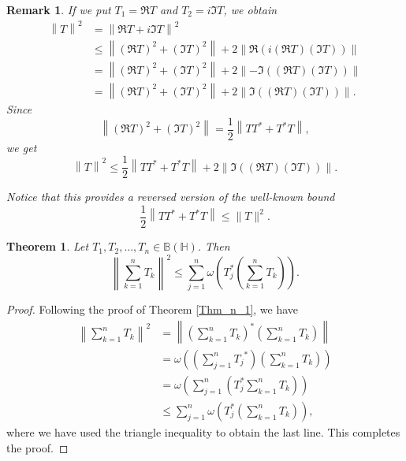 \documentclass[12pt,twoside,reqno]{amsart}
\newtheorem{theorem}{Theorem}[section]
\newtheorem{remark}{Remark}[section]
\numberwithin{equation}{section}
\begin{document}
\begin{remark}
If we put ${{T}_{1}}=\Re T$ and ${{T}_{2}}=i\Im T$, we obtain
	\[\begin{aligned}
   {{\left\| T \right\|}^{2}}&={{\left\| \Re T+i\Im T \right\|}^{2}} \\ 
 & \le \left\| {{\left( \Re T \right)}^{2}}+{{\left( \Im T \right)}^{2}} \right\|+2\left\| \Re\left( i\left( \Re T \right)\left( \Im T \right) \right) \right\| \\ 
 & =\left\| {{\left( \Re T \right)}^{2}}+{{\left( \Im T \right)}^{2}} \right\|+2\left\| -\Im\left( \left( \Re T \right)\left( \Im T \right) \right) \right\| \\ 
 & =\left\| {{\left( \Re T \right)}^{2}}+{{\left( \Im T \right)}^{2}} \right\|+2\left\| \Im\left( \left( \Re T \right)\left( \Im T \right) \right) \right\|.  
\end{aligned}\]
Since
	\[\left\| {{\left( \Re T \right)}^{2}}+{{\left( \Im T \right)}^{2}} \right\|=\frac{1}{2}\left\| T{{T}^{*}}+{{T}^{*}}T \right\|,\]
we get
	\[{{\left\| T \right\|}^{2}}\le \frac{1}{2}\left\| T{{T}^{*}}+{{T}^{*}}T \right\|+2\left\| \Im \left( \left( \Re T \right)\left( \Im T \right) \right) \right\|.\]
	
	Notice that this provides a reversed version of the well-known bound
	\[ \frac{1}{2}\left\| T{{T}^{*}}+{{T}^{*}}T \right\|\leq\|T\|^2.\]
\end{remark}














\begin{theorem}\label{Thm_n_2}
 Let ${{T}_{1}},{{T}_{2}},\ldots ,{{T}_{n}}\in \mathbb B\left( \mathbb H \right)$. Then 
	\[{{\left\| \sum\limits_{k=1}^{n}{{{T}_{k}}} \right\|}^{2}}\le \sum\limits_{j=1}^{n}{\omega \left( T_{j}^{*}\left( \sum\limits_{k=1}^{n}{{{T}_{k}}} \right) \right)}.\]
\end{theorem}
\begin{proof}
Following the proof of Theorem \ref{Thm_n_1}, we have
\begin{align*}
{{\left\| \sum\limits_{k=1}^{n}{{{T}_{k}}} \right\|}^{2}}&=\left\|\left(\sum\limits_{k=1}^{n}{{{T}_{k}}}\right)^*\left(\sum\limits_{k=1}^{n}T_{k}\right)\right\|\\
&=\omega\left( \left(\sum\limits_{j=1}^{n}{{{T}_{j}}}^*\right)\left(\sum\limits_{k=1}^{n}T_{k}\right)     \right)\\
&=\omega\left(\sum_{j=1}^{n}\left(T_j^*\sum_{k=1}^{n}T_{k}\right)\right)\\
&\leq \sum_{j=1}^{n}{\omega \left( T_{j}^{*}\left( \sum\limits_{k=1}^{n}{{{T}_{k}}} \right) \right)},
\end{align*}
where we have used the triangle inequality to obtain the last line. This completes the proof.
\end{proof}
\end{document}
